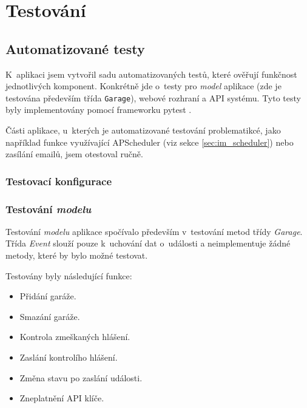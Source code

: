 \chapter{Testování}
\label{sec:te}

\section{Automatizované testy}

K~aplikaci jsem vytvořil sadu automatizovaných testů, které ověřují funkčnost jednotlivých komponent. Konkrétně jde o~testy pro \textit{model} aplikace (zde je testována především třída \texttt{Garage}), webové rozhraní a API systému. Tyto testy byly implementovány pomocí frameworku pytest \cite{pytest}.

Části aplikace, u~kterých je automatizované testování problematikcé, jako například funkce využívající APScheduler (viz sekce \ref{sec:im_scheduler}) nebo zasílání emailů, jsem otestoval ručně.

\subsection{Testovací konfigurace}


\subsection{Testování \textit{modelu}}

Testování \textit{modelu} aplikace spočívalo především v~testování metod třídy \textit{Garage}. Třída \textit{Event} slouží pouze k~uchování dat o~události a neimplementuje žádné metody, které by bylo možné testovat.

Testovány byly následující funkce:

\begin{itemize}
    \item Přidání garáže.
    \item Smazání garáže.
    \item Kontrola zmeškaných hlášení.
    \item Zaslání kontrolího hlášení.
    \item Změna stavu po zaslání události.
    \item Zneplatnění API klíče.
\end{itemize}

